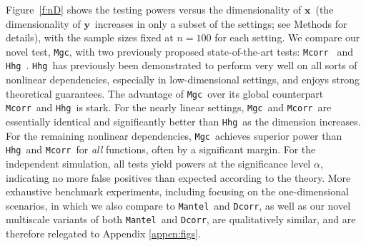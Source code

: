 \documentclass[11pt]{article}
\providecommand{\sct}[1]{{\sc \texttt{#1}}}
\providecommand{\mb}[1]{\boldsymbol{#1}}
\newcommand{\Mgc}{\sct{Mgc}}
\newcommand{\Mgcm}{\sct{Mgc$_M$}}
\newcommand{\Hhg}{\sct{Hhg}}
\newcommand{\Dcorr}{\sct{Dcorr}}
\newcommand{\Mcorr}{\sct{Mcorr}}
\newcommand{\Mantel}{\sct{Mantel}}
\newcommand{\mbx}{\ensuremath{\mb{x}}}
\newcommand{\mby}{\ensuremath{\mb{y}}}
\begin{document}




Figure~\ref{f:nD} shows the testing powers versus the dimensionality of \mbx~(the dimensionality of \mby~increases in only a subset of the settings; see Methods for details), with the sample sizes fixed at $n=100$ for each setting.  We compare  our novel test, \Mgc, with two previously proposed state-of-the-art tests: \Mcorr~\cite{SzekelyRizzo2013a} and \Hhg~\cite{HellerGorfine2013}.  \Hhg~has previously been demonstrated to perform very well on all sorts of nonlinear dependencies, especially in low-dimensional settings, and enjoys strong theoretical guarantees. 
% 
The advantage of \Mgc~over its global counterpart \Mcorr~and \Hhg~is  stark. For the nearly linear settings, \Mgc~and \Mcorr~are essentially identical and significantly better than \Hhg~as the dimension increases.  For the remaining nonlinear dependencies, \Mgc~achieves superior power than \Hhg~and \Mcorr~for \emph{all} functions, often by a significant margin.  For the independent simulation, all tests yield powers at the significance level $\alpha$,  indicating no more false positives than expected according to the theory.
More exhaustive benchmark experiments, including focusing on the one-dimensional scenarios,
in which we also compare to \Mantel~and \Dcorr, 
as well as our novel multiscale variants of both \Mantel~and \Dcorr, 
 are qualitatively similar, and are therefore relegated to Appendix \ref{appen:figs}. 
\end{document}
